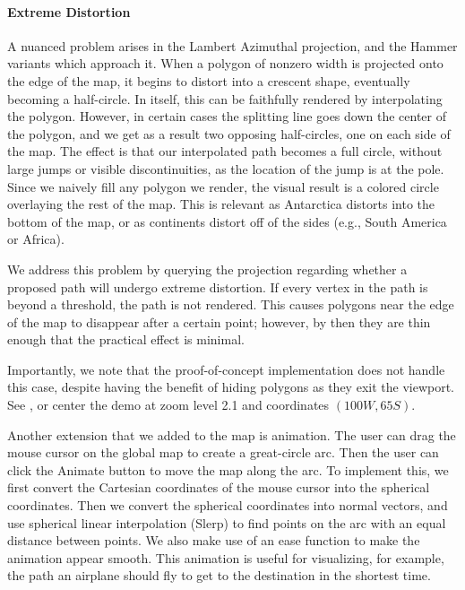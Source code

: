 \paragraph{Extreme Distortion}
A nuanced problem arises in the Lambert Azimuthal projection, and the Hammer
  variants which approach it.
When a polygon of nonzero width is projected onto the edge of the map, it
  begins to distort into a crescent shape, eventually becoming a half-circle.
In itself, this can be faithfully rendered by interpolating the polygon.
However, in certain cases the splitting line goes down the center of the
  polygon, and we get as a result two opposing half-circles, one on each side
  of the map.
The effect is that our interpolated path becomes a full circle, without large
  jumps or visible discontinuities, as the location of the jump is at the pole.
Since we naively fill any polygon we render, the visual result is a colored
  circle overlaying the rest of the map.
This is relevant as Antarctica distorts into the bottom of the map, or as
  continents distort off of the sides (e.g., South America or Africa).

We address this problem by querying the projection regarding whether a
  proposed path will undergo extreme distortion.
If every vertex in the path is beyond a threshold, the path is not rendered.
This causes polygons near the edge of the map to disappear after a certain
  point; however, by then they are thin enough that the practical effect is
  minimal.

Importantly, we note that the proof-of-concept implementation does not handle
  this case, despite having the benefit of hiding polygons as they exit the
  viewport.
See , or center the demo at zoom level 2.1 and coordinates
  $(100W, 65S)$.



Another extension that we added to the map is animation. The user can drag the mouse cursor on the global map to create a great-circle arc. Then the user can click the Animate button to move the map along the arc. To implement this, we first convert the Cartesian coordinates of the mouse cursor into the spherical coordinates. Then we convert the spherical coordinates into normal vectors, and use spherical linear interpolation (Slerp) to find points on the arc with an equal distance between points. We also make use of an ease function to make the animation appear smooth. This animation is useful for visualizing, for example, the path an airplane should fly to get to the destination in the shortest time.

